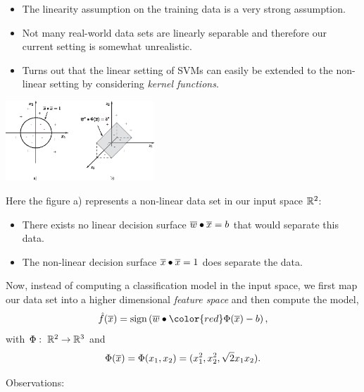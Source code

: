 \documentclass[a4paper,blends,pdf,colorBG,slideColor]{prosper}
\begin{document}
\vspace{.2in}
\begin{itemize}
\item
The linearity assumption on the training data is a very strong assumption.

\item
Not many real-world data sets are linearly separable and therefore our current setting is
somewhat unrealistic.

\item
Turns out that the linear setting of SVMs can easily be extended to the non-linear setting
by considering {\em kernel functions}.

\end{itemize}
\es

\small
\begin{center}
\includegraphics[height=30mm]{figures/fig07-03.eps}
\end{center}
Here the figure a) represents a non-linear data set in our input space $\mathbb{R}^{2}$:
\begin{itemize}
\item
There exists no linear decision surface $\overline{w}\bullet\overline{x}=b$
that would separate this data.
\item
The non-linear decision surface $\overline{x}\bullet\overline{x} = 1$ does separate the data.
\end{itemize}
Now, instead of computing a classification model in the input space, we first map our data set
into a higher dimensional {\em feature space} and then compute the model,
\begin{equation*}
\model{f}(\ol{x}) = \sign \left (\ol{w}\bullet{\color{red}\Phi}(\ol{x}) - b\right),
\end{equation*}
with $\Phi\,\colon\; \mathbb{R}^{2} \rightarrow \mathbb{R}^{3}$ and
\begin{equation*}
\Phi(\overline{x}) = \Phi(x_1,x_2) = (x_1^2,x_2^2,\sqrt{2}x_1 x_2) .
\end{equation*}
\es

\vspace{.2in}
Observations:
\end{document}
